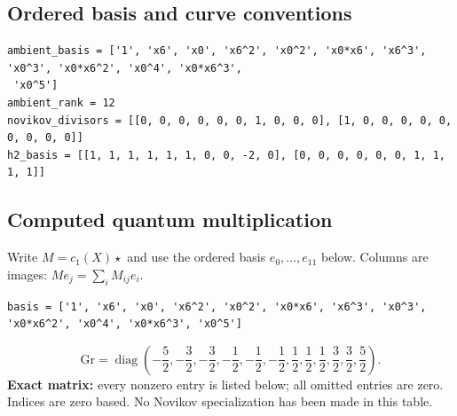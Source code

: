 \documentclass[10pt,a4paper]{article}
\begin{document}
\subsection*{Ordered basis and curve conventions}
\begin{lstlisting}
ambient_basis = ['1', 'x6', 'x0', 'x6^2', 'x0^2', 'x0*x6', 'x6^3', 'x0^3', 'x0*x6^2', 'x0^4', 'x0*x6^3',
 'x0^5']
ambient_rank = 12
novikov_divisors = [[0, 0, 0, 0, 0, 0, 1, 0, 0, 0], [1, 0, 0, 0, 0, 0, 0, 0, 0, 0]]
h2_basis = [[1, 1, 1, 1, 1, 1, 0, 0, -2, 0], [0, 0, 0, 0, 0, 0, 1, 1, 1, 1]]
\end{lstlisting}
\subsection*{Computed quantum multiplication}
Write $M=c_1(X)\star$ and use the ordered basis $e_0,\ldots,e_{11}$ below. Columns are images: $M e_j=\sum_i M_{ij}e_i$.
\begin{lstlisting}
basis = ['1', 'x6', 'x0', 'x6^2', 'x0^2', 'x0*x6', 'x6^3', 'x0^3', 'x0*x6^2', 'x0^4', 'x0*x6^3', 'x0^5']
\end{lstlisting}
\[\mathrm{Gr}=\operatorname{diag}\!\left(- \frac{5}{2},- \frac{3}{2},- \frac{3}{2},- \frac{1}{2},- \frac{1}{2},- \frac{1}{2},\frac{1}{2},\frac{1}{2},\frac{1}{2},\frac{3}{2},\frac{3}{2},\frac{5}{2}\right).\]
\textbf{Exact matrix:} every nonzero entry is listed below; all omitted entries are zero. Indices are zero based. No Novikov specialization has been made in this table.
\end{document}
